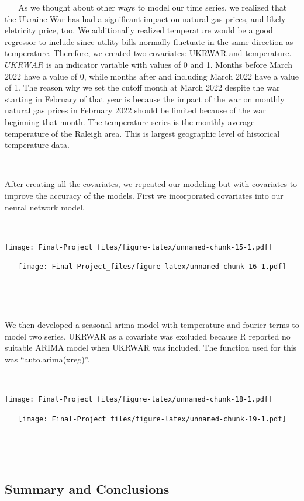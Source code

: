 \documentclass[
]{article}
\begin{document}
~ ~ As we thought about other ways to model our time series, we realized
that the Ukraine War has had a significant impact on natural gas prices,
and likely eletricity price, too. We additionally realized temperature
would be a good regressor to include since utility bills normally
fluctuate in the same direction as temperature. Therefore, we created
two covariates: UKRWAR and temperature. \(UKRWAR\) is an indicator
variable with values of 0 and 1. Months before March 2022 have a value
of 0, while months after and including March 2022 have a value of 1. The
reason why we set the cutoff month at March 2022 despite the war
starting in February of that year is because the impact of the war on
monthly natural gas prices in February 2022 should be limited because of
the war beginning that month. The temperature series is the monthly
average temperature of the Raleigh area. This is largest geographic
level of historical temperature data. ~ ~

~ ~

After creating all the covariates, we repeated our modeling but with
covariates to improve the accuracy of the models. First we incorporated
covariates into our neural network model.

~ ~

\texttt{[image: Final-Project\_files/figure-latex/unnamed-chunk-15-1.pdf]}

~ ~
\texttt{[image: Final-Project\_files/figure-latex/unnamed-chunk-16-1.pdf]}

~ ~

~ ~

We then developed a seasonal arima model with temperature and fourier
terms to model two series. UKRWAR as a covariate was excluded because R
reported no suitable ARIMA model when UKRWAR was included. The function
used for this was ``auto.arima(xreg)''.

~ ~

\texttt{[image: Final-Project\_files/figure-latex/unnamed-chunk-18-1.pdf]}

~ ~
\texttt{[image: Final-Project\_files/figure-latex/unnamed-chunk-19-1.pdf]}

~ ~

~ ~

\hypertarget{summary-and-conclusions}{%
\subsection{Summary and Conclusions}\label{summary-and-conclusions}}
\end{document}
